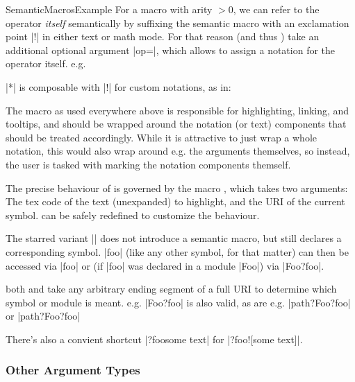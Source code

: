 \begin{@module}{SemanticMacrosExample}
   For a macro with arity $>0$, we can refer to the operator
   \emph{itself} semantically by suffixing the semantic macro
   with an exclamation point |!| in either text or math mode.
   For that reason  (and thus ) take an
   additional optional argument |op=|, which allows to assign
   a notation for the operator itself. e.g.

  |*| is composable with |!| for custom notations, as in:


 The macro  as used everywhere above is responsible
 for highlighting, linking, and tooltips, and should be wrapped
 around the notation (or text) components that should be treated
 accordingly. While it is attractive to just wrap a whole notation,
 this would also wrap around e.g. the arguments themselves, so
 instead, the user is tasked with marking the notation components
 themself.

 The precise behaviour of  is governed by
 the macro , which takes two arguments: The tex code
 of the text
 (unexpanded) to highlight, and the URI of the current symbol.
  can be safely redefined to customize the behaviour.


 The starred variant || does not introduce a semantic
 macro, but still declares a corresponding symbol. |foo| (like
 any other symbol, for that matter) can
 then be accessed via |{foo}| or (if |foo| was declared
 in a module |Foo|) via |{Foo}?{foo}|.

 both  and  take any
 arbitrary ending segment of a full URI to determine
 which symbol or module is meant. e.g.
 |{Foo?foo}| is also valid, as are e.g.
 |{path?Foo}?{foo}| or
 |{path?Foo?foo}|

 There's also a convient shortcut |{?foo}{some text}| for
 |{?foo}![some text]|.

 \end{@module}

 \subsubsection{Other Argument Types}

